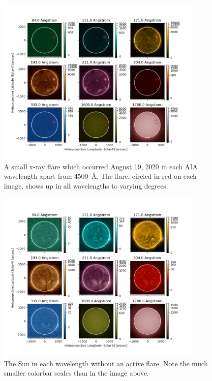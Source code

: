 \documentclass[12pt, letterpaper]{article}
\begin{document}
\begin{figure}[ht]
	\includegraphics[width=0.9\textwidth]{figures/0819_flare_labeled.png}
	\centering
	\caption{A small x-ray flare which occurred August 19, 2020 in each AIA wavelength apart from 4500~\AA{}. The flare, circled in red on each image, shows up in all wavelengths to varying degrees.}
	\label{flare}
\end{figure}

\begin{figure}[ht]
	\includegraphics[width=0.9\textwidth]{figures/noflare.png}
	\centering
	\caption{The Sun in each wavelength without an active flare. Note the much smaller colorbar scales than in the image above.}
	\label{noflare}
\end{figure}
\end{document}
